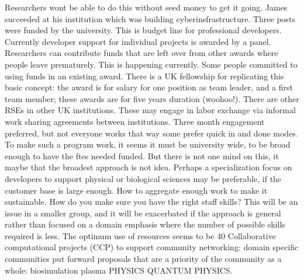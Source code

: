 Researchers wont be able to do this without seed money to get it going. James succeeded at his institution which was building cyberinsfrastructure. Three posts were funded by the university. This is budget line for professional developers. Currently developer support for individual projects is awarded by a panel. Researchers can contribute funds that are left over from other awards where people leave prematurely. This is happening currently.  Some people committed to using funds in an existing award. There is a UK fellowship for replicating this basic concept: the award is for salary for one position as team leader,  and a first team member; these awards are for five years duration (woohoo!). There are other RSEs in other UK institutions. These may engage in labor exchange via  informal work sharing agreements between institutions. Three month engagement preferred, but not everyone works that way some prefer quick in and done modes. 
To make such a program work, it seems it  must be university wide, to be broad enough to have the ftes needed funded. But there is not one mind on this, it maybe that the broadest approach is not idea. Perhaps a specialization focus on developers to support physical or biological sciences may be preferable, if the customer base is large enough. How to aggregate enough work to make it sustainable. How do you make sure you have the right staff skills? This will be an issue in a smaller group, and it will be exacerbated if the approach is general rather than focused on a domain emphasis where the number of possible skills required is less. The optimum use of resources seems to be 40%
Collaborative computational projects (CCP) to support community networking: domain specific communities put forward proposals that are a priority of the community as a whole: biosimulation plasma PHYSICS QUANTUM PHYSICS. %

